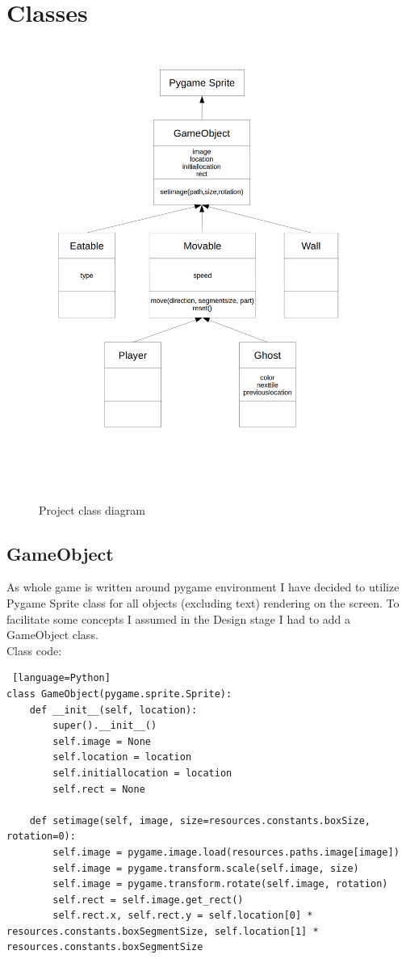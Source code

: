 \documentclass[11pt,a4paper]{report}
\newcommand{\dsubsection}[1]{\FloatBarrier \subsection{#1}}
\newenvironment{img}{
	\begin{center}
		\begin{figure}[H]
			\begin{center}
			
}{
	\end{center}
		\end{figure}
			\end{center}
}
\begin{document}
		\section{Classes}
		\label{classes}
			\begin{img}
				\includegraphics[width=400pt]{images/class_diagram}\\
				\caption{Project class diagram}
			\end{img}
			\dsubsection{GameObject}
				As whole game is written around pygame environment I have decided to utilize Pygame Sprite class for all objects (excluding text) rendering on the screen. To facilitate some concepts I assumed in the Design stage I had to add a GameObject class.\\
				Class code:
				\begin{lstlisting} [language=Python]
class GameObject(pygame.sprite.Sprite):
	def __init__(self, location):
		super().__init__()
		self.image = None
		self.location = location
		self.initiallocation = location
		self.rect = None

	def setimage(self, image, size=resources.constants.boxSize, rotation=0):
		self.image = pygame.image.load(resources.paths.image[image])
		self.image = pygame.transform.scale(self.image, size)
		self.image = pygame.transform.rotate(self.image, rotation)
		self.rect = self.image.get_rect()
		self.rect.x, self.rect.y = self.location[0] * resources.constants.boxSegmentSize, self.location[1] * resources.constants.boxSegmentSize
				\end{lstlisting}
\end{document}
